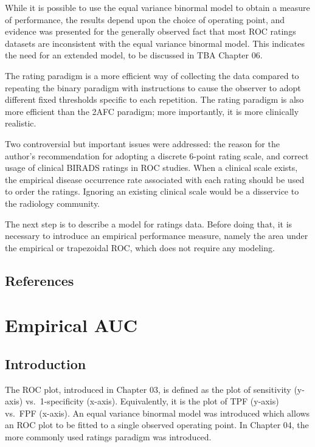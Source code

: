 \documentclass[
]{book}
\begin{document}
While it is possible to use the equal variance binormal model to obtain a measure of performance, the results depend upon the choice of operating point, and evidence was presented for the generally observed fact that most ROC ratings datasets are inconsistent with the equal variance binormal model. This indicates the need for an extended model, to be discussed in TBA Chapter 06.

The rating paradigm is a more efficient way of collecting the data compared to repeating the binary paradigm with instructions to cause the observer to adopt different fixed thresholds specific to each repetition. The rating paradigm is also more efficient than the 2AFC paradigm; more importantly, it is more clinically realistic.

Two controversial but important issues were addressed: the reason for the author's recommendation for adopting a discrete 6-point rating scale, and correct usage of clinical BIRADS ratings in ROC studies. When a clinical scale exists, the empirical disease occurrence rate associated with each rating should be used to order the ratings. Ignoring an existing clinical scale would be a disservice to the radiology community.

The next step is to describe a model for ratings data. Before doing that, it is necessary to introduce an empirical performance measure, namely the area under the empirical or trapezoidal ROC, which does not require any modeling.

\hypertarget{ratingsParadigm-references}{%
\section{References}\label{ratingsParadigm-references}}

\hypertarget{empirical-AUC}{%
\chapter{Empirical AUC}\label{empirical-AUC}}

\hypertarget{empirical-AUC-Intro}{%
\section{Introduction}\label{empirical-AUC-Intro}}

The ROC plot, introduced in Chapter 03, is defined as the plot of sensitivity (y-axis) vs.~1-specificity (x-axis). Equivalently, it is the plot of TPF (y-axis) vs.~FPF (x-axis). An equal variance binormal model was introduced which allows an ROC plot to be fitted to a single observed operating point. In Chapter 04, the more commonly used ratings paradigm was introduced.
\end{document}
